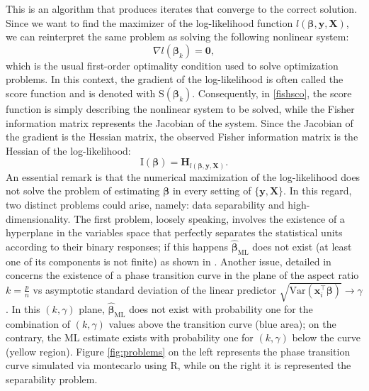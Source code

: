 \documentclass{article}
\begin{document}
This is an algorithm that produces iterates that converge to the correct solution. Since we want to find the maximizer of the log-likelihood function $l(\boldsymbol{\beta,\mathbf{y},\mathbf{X}})$, we can reinterpret the same problem as solving the following nonlinear system:
\begin{equation}
\nabla l(\boldsymbol{\beta}_k)=\mathbf{0},
\end{equation}
which is the usual first-order optimality condition used to solve optimization problems. In this context, the gradient of the log-likelihood is often called the score function and is denoted with $\text{S}(\boldsymbol{\beta}_k)$. Consequently, in \eqref{fishsco}, the score function is simply describing the nonlinear system to be solved, while the Fisher information matrix represents the Jacobian of the system. Since the Jacobian of the gradient is the Hessian matrix, the observed Fisher information matrix is the Hessian of the log-likelihood:
\begin{equation*}
\text{I}(\boldsymbol{\beta})=\mathbf{H}_{l(\boldsymbol{\beta,\mathbf{y},\mathbf{X}})}.
\end{equation*}
An essential remark is that the numerical maximization of the log-likelihood does not solve the problem of estimating $\boldsymbol{\beta}$ in every setting of $\{\mathbf{y},\mathbf{X}\}$. In this regard, two distinct problems could arise, namely: data separability and high-dimensionality. The first problem, loosely speaking, involves the existence of a hyperplane in the variables space that perfectly separates the statistical units according to their binary responses; if this happens $\hat{\boldsymbol{\beta}}_{\text{ML}}$ does not exist (at least one of its components is not finite) as shown in \citep{albertander}. Another issue, detailed in \citep{candessur} concerns the existence of a phase transition curve in the plane of the aspect ratio $k=\frac{p}{n}$ vs asymptotic standard deviation of the linear predictor $\sqrt{\text{Var}(\mathbf{x}_i^\top\boldsymbol{\beta})}\rightarrow\gamma$. In this $(k,\gamma)$ plane, $\hat{\boldsymbol{\beta}}_{\text{ML}}$ does not exist with probability one for the combination of $(k,\gamma)$ values above the transition curve (blue area); on the contrary, the ML estimate exists with probability one for $(k,\gamma)$ below the curve (yellow region). 
Figure \ref{fig:problems} on the left represents the phase transition curve simulated via montecarlo using R, while on the right it is represented the separability problem.
\end{document}
